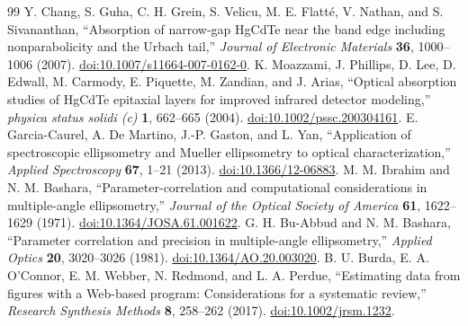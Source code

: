 \begin{thebibliography}{99}
 Y. Chang, S. Guha, C. H. Grein, S. Velicu, M. E. Flatt\'e, V. Nathan, and S. Sivananthan, ``Absorption of narrow-gap HgCdTe near the band edge including nonparabolicity and the Urbach tail,'' \emph{Journal of Electronic Materials} \textbf{36}, 1000--1006 (2007). \href{https://doi.org/10.1007/s11664-007-0162-0}{doi:10.1007/s11664-007-0162-0}.
 K. Moazzami, J. Phillips, D. Lee, D. Edwall, M. Carmody, E. Piquette, M. Zandian, and J. Arias, ``Optical absorption studies of HgCdTe epitaxial layers for improved infrared detector modeling,'' \emph{physica status solidi (c)} \textbf{1}, 662--665 (2004). \href{https://doi.org/10.1002/pssc.200304161}{doi:10.1002/pssc.200304161}.
 E. Garcia-Caurel, A. De Martino, J.-P. Gaston, and L. Yan, ``Application of spectroscopic ellipsometry and Mueller ellipsometry to optical characterization,'' \emph{Applied Spectroscopy} \textbf{67}, 1--21 (2013). \href{https://doi.org/10.1366/12-06883}{doi:10.1366/12-06883}.
 M. M. Ibrahim and N. M. Bashara, ``Parameter-correlation and computational considerations in multiple-angle ellipsometry,'' \emph{Journal of the Optical Society of America} \textbf{61}, 1622--1629 (1971). \href{https://doi.org/10.1364/JOSA.61.001622}{doi:10.1364/JOSA.61.001622}.
 G. H. Bu-Abbud and N. M. Bashara, ``Parameter correlation and precision in multiple-angle ellipsometry,'' \emph{Applied Optics} \textbf{20}, 3020--3026 (1981). \href{https://doi.org/10.1364/AO.20.003020}{doi:10.1364/AO.20.003020}.
 B. U. Burda, E. A. O'Connor, E. M. Webber, N. Redmond, and L. A. Perdue, ``Estimating data from figures with a Web-based program: Considerations for a systematic review,'' \emph{Research Synthesis Methods} \textbf{8}, 258--262 (2017). \href{https://doi.org/10.1002/jrsm.1232}{doi:10.1002/jrsm.1232}.
\end{thebibliography}
